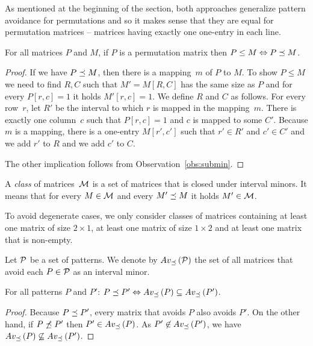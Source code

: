 As mentioned at the beginning of the section, both approaches generalize pattern avoidance for permutations and so it makes sense that they are equal for permutation matrices -- matrices having exactly one one-entry in each line.

\begin{obs}
\label{obs:perm}
For all matrices $P$ and $M$, if $P$ is a permutation matrix then $P\leq M\Leftrightarrow P\preceq M$.
\end{obs}
\begin{proof}
If we have $P\preceq M$, then there is a mapping~$m$ of $P$ to $M$. To show $P\leq M$ we need to find $R,C$ such that $M'=M[R,C]$ has the same size as $P$ and for every $P[r,c]=1$ it holds $M'[r,c]=1$. We define $R$ and $C$ as follows. For every row~$r$, let $R'$ be the interval to which $r$ is mapped in the mapping~$m$. There is exactly one column~$c$ such that $P[r,c]=1$ and $c$ is mapped to some $C'$. Because $m$ is a mapping, there is a one-entry $M[r',c']$ such that $r'\in R'$ and $c'\in C'$ and we add $r'$ to $R$ and we add $c'$ to $C$.

The other implication follows from Observation~\ref{obs:submin}.
\end{proof}

\begin{defn}
A \emph{class} of matrices~$\mathcal{M}$ is a set of matrices that is closed under interval minors. It means that for every $M\in\mathcal{M}$ and every $M'\preceq M$ it holds $M'\in\mathcal{M}$.
\end{defn}

To avoid degenerate cases, we only consider classes of matrices containing at least one matrix of size $2\times1$, at least one matrix of size $1\times2$ and at least one matrix that is non-empty.

\begin{defn}
Let $\mathcal{P}$ be a set of patterns. We denote by $Av_{\preceq}\left(\mathcal{P}\right)$ the set of all matrices that avoid each $P\in\mathcal{P}$ as an interval minor.
\end{defn}

\begin{obs}
\label{obs:im}
For all patterns $P$ and $P'$: $P\preceq P'\Leftrightarrow Av_{\preceq}\left(P\right)\subseteq Av_{\preceq}\left(P'\right)$.
\end{obs}
\begin{proof}
Because $P\preceq P'$, every matrix that avoids $P$ also avoids $P'$. On the other hand, if $P\not\preceq P'$ then $P'\in Av_{\preceq}\left(P\right)$. As $P'\not\in Av_{\preceq}\left(P'\right)$, we have $Av_{\preceq}\left(P\right)\not\subseteq Av_{\preceq}\left(P'\right)$.
\end{proof}


